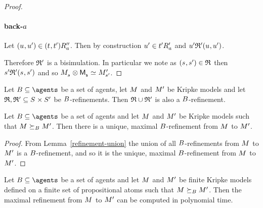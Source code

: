 \begin{proof}
\paragraph{back-$a$}
Let $(\kStateU, \kStateUP) \in \kSuccessorsPPA{(\kStateT, \kStateTP)}$.
Then by construction ${u}^{\prime} \in {{t}^{\prime}} {R^{\prime}_{a}}$ and $\kStateUP \bisimulation' (\kStateU, \kStateUP)$.

Therefore $\mathfrak{R}'$ is a bisimulation.
In particular we note as $(\kStateS, \kStateSP) \in \refinement$ then $\kStateSP \bisimulation' (\kStateS, \kStateSP)$ and so $\kPModel{\kStateS} \exec \aPModel{\aStateS} \bisimilar \kPModelP{\kStateSP}$.
\end{proof}

\begin{lemma}\label{refinement-union}
Let $\agentsB \subseteq \agents$ be a set of agents, let $\kModel$ and ${M^{\prime}_{}}$ be Kripke models and let $\refinement, \refinement' \subseteq \kStates \times \kStatesP$ be $B$-refinements.
Then $\mathfrak{R} \cup \mathfrak{R}'$ is also a $B$-refinement.
\end{lemma}

\begin{proposition}
Let $\agentsB \subseteq \agents$ be a set of agents and let $\kModel$ and ${M^{\prime}_{}}$ be Kripke models such that $\kModel \simulatesBs \kModelP$.
Then there is a unique, maximal $B$-refinement from $\kModel$ to ${M^{\prime}_{}}$.
\end{proposition}

\begin{proof}
From Lemma~\ref{refinement-union} the union of all $B$-refinements from $\kModel$ to ${M^{\prime}_{}}$ is a $B$-refinement, and so it is the unique, maximal $B$-refinement from $\kModel$ to ${M^{\prime}_{}}$.
\end{proof}

\begin{proposition}
Let $\agentsB \subseteq \agents$ be a set of agents and let $\kModel$ and ${M^{\prime}_{}}$ be finite Kripke models defined on a finite set of propositional atoms such that $\kModel \simulatesBs \kModelP$.
Then the maximal refinement from $\kModel$ to ${M^{\prime}_{}}$ can be computed in polynomial time.
\end{proposition}

